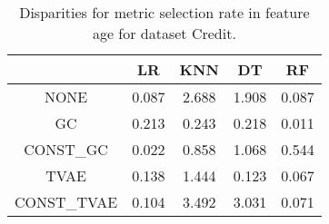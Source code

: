 \begin{table}
\caption{Disparities for metric selection rate in feature age for dataset Credit.}
\label{tab:disp-CREDIT-age-selection_rate}
\begin{tabular}{ccccc}
\toprule
 & LR & KNN & DT & RF \\
\midrule
NONE & 0.087 & 2.688 & 1.908 & 0.087 \\
GC & 0.213 & 0.243 & 0.218 & 0.011 \\
CONST\_GC & 0.022 & 0.858 & 1.068 & 0.544 \\
TVAE & 0.138 & 1.444 & 0.123 & 0.067 \\
CONST\_TVAE & 0.104 & 3.492 & 3.031 & 0.071 \\
\bottomrule
\end{tabular}
\end{table}
